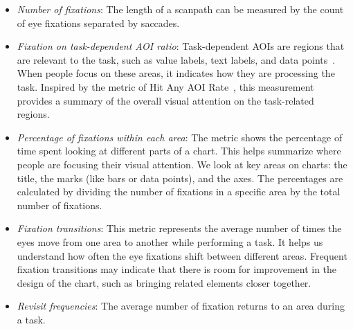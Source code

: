 \begin{itemize}
    \item \textit{Number of fixations}: The length of a scanpath can be measured by the count of eye fixations separated by saccades. 
    \item \textit{Fixation on task-dependent AOI ratio}: Task-dependent AOIs are regions that are relevant to the task, such as value labels, text labels, and data points~\cite{polatsek2018exploring}. When people focus on these areas, it indicates how they are processing the task. Inspired by the metric of Hit Any AOI Rate~\cite{wang22_etvis}, this measurement provides a summary of the overall visual attention on the task-related regions.
    \item \textit{Percentage of fixations within each area}: The metric shows the percentage of time spent looking at different parts of a chart. This helps summarize where people are focusing their visual attention. We look at key areas on charts: the title, the marks (like bars or data points), and the axes. The percentages are calculated by dividing the number of fixations in a specific area by the total number of fixations.
    \item \textit{Fixation transitions}: This metric represents the average number of times the eyes move from one area to another while performing a task. It helps us understand how often the eye fixations shift between different areas. Frequent fixation transitions may indicate that there is room for improvement in the design of the chart, such as bringing related elements closer together.
    \item \textit{Revisit frequencies}: The average number of fixation returns to an area during a task.
\end{itemize}


